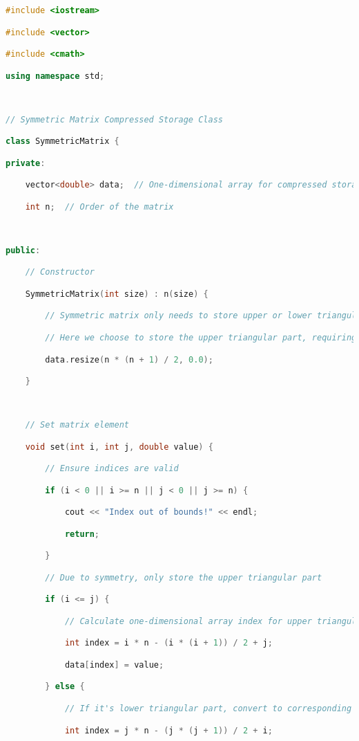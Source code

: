 \begin{lstlisting}[language=C++]
#include <iostream>

#include <vector>

#include <cmath>

using namespace std;

  

// Symmetric Matrix Compressed Storage Class

class SymmetricMatrix {

private:

    vector<double> data;  // One-dimensional array for compressed storage

    int n;  // Order of the matrix

  

public:

    // Constructor

    SymmetricMatrix(int size) : n(size) {

        // Symmetric matrix only needs to store upper or lower triangular part

        // Here we choose to store the upper triangular part, requiring n*(n+1)/2 elements

        data.resize(n * (n + 1) / 2, 0.0);

    }

  

    // Set matrix element

    void set(int i, int j, double value) {

        // Ensure indices are valid

        if (i < 0 || i >= n || j < 0 || j >= n) {

            cout << "Index out of bounds!" << endl;

            return;

        }

        // Due to symmetry, only store the upper triangular part

        if (i <= j) {

            // Calculate one-dimensional array index for upper triangular part

            int index = i * n - (i * (i + 1)) / 2 + j;

            data[index] = value;

        } else {

            // If it's lower triangular part, convert to corresponding upper triangular position

            int index = j * n - (j * (j + 1)) / 2 + i;


\end{lstlisting}
